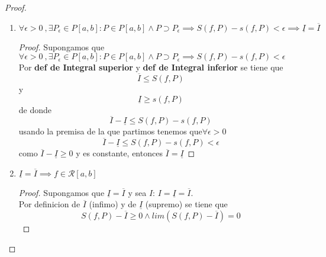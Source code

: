 \documentclass{article}
\begin{document}
\begin{proof}
\begin{enumerate}
\begin{proof}
\end{proof}
\item \(\forall \epsilon>0\ ,  \exists P_\epsilon \in P[a, b]: P \in P[a, b] \wedge P \supset P_\epsilon \implies S(f, P) - s(f, P) < \epsilon \implies \underline{I} = \overline{I}\)
\begin{proof}
Supongamos que \(\forall \epsilon>0\ ,  \exists P_\epsilon \in P[a, b]: P \in P[a, b] \wedge P \supset P_\epsilon \implies S(f, P) - s(f, P) < \epsilon\)\\

Por \textbf{def de Integral superior} y \textbf{def de Integral inferior} se tiene que
\[
 \overline{I} \leq S(f, P) 
\]
y
\[
 \underline{I} \geq s(f, P)
\]
de donde 
\[
 \overline{I}  -  \underline{I} \leq S(f,P) - s(f,P) 
\]
usando la premisa de la que partimos tenemos que\( \forall \epsilon > 0\)
\[
 \overline{I}  -  \underline{I} \leq S(f,P) - s(f,P) < \epsilon
\]
como \(\overline{I}  -  \underline{I} \geq 0\) y es constante, entonces \(\overline{I} = \underline{I}\)


\end{proof}

\item \(\underline{I} = \overline{I} \implies f \in \mathcal{R}[a, b]\)\\
\begin{proof}

Supongamos que  \(\underline{I} = \overline{I}\) y sea \(I\): \(I = \underline{I} = \overline{I}\).\\

Por definicion de \(\overline{I}\) (infimo) y de \(\underline{I}\) (supremo) se tiene que 
\[
S(f, P) - \overline{I} \geq 0 \wedge lim (S(f, P) - \overline{I}) = 0
\]


\end{proof}
\end{enumerate}
\end{proof}
\end{document}
